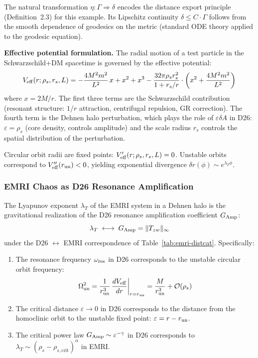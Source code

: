 The natural transformation $\eta: \Gamma \Rightarrow \delta$ encodes the distance export principle (Definition~2.3) for this example. Its Lipschitz continuity $\delta \leq C \cdot \Gamma$ follows from the smooth dependence of geodesics on the metric (standard ODE theory applied to the geodesic equation).

\textbf{Effective potential formulation.} The radial motion of a test particle in the Schwarzschild+DM spacetime is governed by the effective potential:
\begin{equation}\label{eq:veff}
V_{\rm eff}(r; \rho_s, r_s, L) = -\frac{4M^2m^2}{L^2}\,x + x^2 + x^3 - \frac{32\pi\rho_s r_s^2}{1 + r_s/r} \cdot \left(x^2 + \frac{4M^2m^2}{L^2}\right)
\end{equation}
where $x = 2M/r$. The first three terms are the Schwarzschild contribution (resonant structure: $1/r$ attraction, centrifugal repulsion, GR correction). The fourth term is the Dehnen halo perturbation, which plays the role of $\varepsilon\delta A$ in D26: $\varepsilon = \rho_s$ (core density, controls amplitude) and the scale radius $r_s$ controls the spatial distribution of the perturbation.

Circular orbit radii are fixed points: $V_{\rm eff}'(r; \rho_s, r_s, L) = 0$. Unstable orbits correspond to $V_{\rm eff}''(r_{\rm un}) < 0$, yielding exponential divergence $\delta r(\phi) \sim e^{\lambda_T \phi}$.

\subsubsection{EMRI Chaos as D26 Resonance Amplification}\label{subsec:emri-resonance}

\begin{proposition}\label{prop:emri-chaos-resonance}
The Lyapunov exponent $\lambda_T$ of the EMRI system in a Dehnen halo is the gravitational realization of the D26 resonance amplification coefficient $G_{\rm Amp}$:
\begin{equation}
\lambda_T \;\longleftrightarrow\; G_{\rm Amp} = \|T_{zw}\|_\infty
\end{equation}
under the D26 $\leftrightarrow$ EMRI correspondence of Table~\ref{tab:emri-distcat}. Specifically:
\begin{enumerate}
\item The resonance frequency $\omega_{\rm res}$ in D26 corresponds to the unstable circular orbit frequency:
\begin{equation}\label{eq:omega_un}
\Omega_{\rm un}^2 = \frac{1}{r_{\rm un}^3}\,\frac{dV_{\rm eff}}{dr}\bigg|_{r=r_{\rm un}} = \frac{M}{r_{\rm un}^3} + \mathcal{O}(\rho_s)
\end{equation}
\item The critical distance $\varepsilon \to 0$ in D26 corresponds to the distance from the homoclinic orbit to the unstable fixed point: $\varepsilon = r - r_{\rm un}$.
\item The critical power law $G_{\rm Amp} \sim \varepsilon^{-\gamma}$ in D26 corresponds to $\lambda_T \sim (\rho_s - \rho_{s,\text{crit}})^\alpha$ in EMRI.
\end{enumerate}
\end{proposition}

